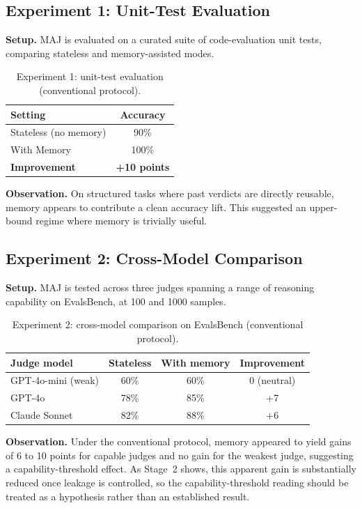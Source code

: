 \documentclass[12pt,a4paper]{report}
\begin{document}
\subsection{Experiment 1: Unit-Test Evaluation}

\textbf{Setup.} MAJ is evaluated on a curated suite of code-evaluation unit tests, comparing stateless and memory-assisted modes.

\begin{table}[h]
\centering
\begin{tabular}{lc}
\toprule
Setting & Accuracy \\
\midrule
Stateless (no memory) & 90\% \\
With Memory & 100\% \\
\textbf{Improvement} & \textbf{+10 points} \\
\bottomrule
\end{tabular}
\caption{Experiment 1: unit-test evaluation (conventional protocol).}
\end{table}

\textbf{Observation.} On structured tasks where past verdicts are directly reusable, memory appears to contribute a clean accuracy lift. This suggested an upper-bound regime where memory is trivially useful.

\subsection{Experiment 2: Cross-Model Comparison}

\textbf{Setup.} MAJ is tested across three judges spanning a range of reasoning capability on EvalsBench, at 100 and 1000 samples.

\begin{table}[h]
\centering
\begin{tabular}{lccc}
\toprule
Judge model & Stateless & With memory & Improvement \\
\midrule
GPT-4o-mini (weak) & 60\% & 60\% & 0 (neutral) \\
GPT-4o & 78\% & 85\% & +7 \\
Claude Sonnet & 82\% & 88\% & +6 \\
\bottomrule
\end{tabular}
\caption{Experiment 2: cross-model comparison on EvalsBench (conventional protocol).}
\end{table}

\textbf{Observation.} Under the conventional protocol, memory appeared to yield gains of 6 to 10 points for capable judges and no gain for the weakest judge, suggesting a capability-threshold effect. As Stage~2 shows, this apparent gain is substantially reduced once leakage is controlled, so the capability-threshold reading should be treated as a hypothesis rather than an established result.
\end{document}
